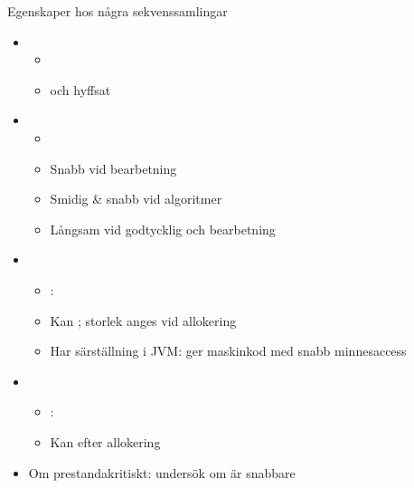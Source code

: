 \begin{Slide}{Egenskaper hos några sekvenssamlingar}
\begin{itemize}\SlideFontSmall

\item {} 
  \begin{itemize}\SlideFontSmall
  \item {}
  \item {} och hyffsat 
  \end{itemize}

\item {}   
  \begin{itemize}\SlideFontSmall
  \item {}
  \item Snabb vid bearbetning  
  \item Smidig \& snabb vid  algoritmer
  \item Långsam vid godtycklig  och bearbetning 
  \end{itemize}

\item {} 
  \begin{itemize}\SlideFontSmall
  \item {}: 
  \item Kan ; storlek anges vid allokering
  \item Har särställning i JVM: ger maskinkod med snabb minnesaccess  
  \end{itemize}

\item {}  
  \begin{itemize}\SlideFontSmall
  \item {}: 
  \item Kan  efter allokering
  \end{itemize}

\item Om prestandakritiskt: undersök om  är snabbare  

\end{itemize}
\end{Slide}




